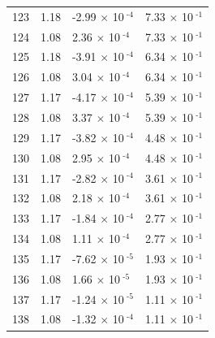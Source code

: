 \documentclass[a4paper,11pt]{article}
\begin{document}
\begin{center}
\begin{longtable}{|R{1.5cm}|R{2.5cm}|R{2.5cm}|R{2.5cm}|}
  123 &   1.18  &        -2.99 $\times$ 10$^{\text{          -4}}$  &         7.33 $\times$ 10$^{\text{          -1}}$ \\ 
  124 &   1.08  &         2.36 $\times$ 10$^{\text{          -4}}$  &         7.33 $\times$ 10$^{\text{          -1}}$ \\ 
  125 &   1.18  &        -3.91 $\times$ 10$^{\text{          -4}}$  &         6.34 $\times$ 10$^{\text{          -1}}$ \\ 
  126 &   1.08  &         3.04 $\times$ 10$^{\text{          -4}}$  &         6.34 $\times$ 10$^{\text{          -1}}$ \\ 
  127 &   1.17  &        -4.17 $\times$ 10$^{\text{          -4}}$  &         5.39 $\times$ 10$^{\text{          -1}}$ \\ 
  128 &   1.08  &         3.37 $\times$ 10$^{\text{          -4}}$  &         5.39 $\times$ 10$^{\text{          -1}}$ \\ 
  129 &   1.17  &        -3.82 $\times$ 10$^{\text{          -4}}$  &         4.48 $\times$ 10$^{\text{          -1}}$ \\ 
  130 &   1.08  &         2.95 $\times$ 10$^{\text{          -4}}$  &         4.48 $\times$ 10$^{\text{          -1}}$ \\ 
  131 &   1.17  &        -2.82 $\times$ 10$^{\text{          -4}}$  &         3.61 $\times$ 10$^{\text{          -1}}$ \\ 
  132 &   1.08  &         2.18 $\times$ 10$^{\text{          -4}}$  &         3.61 $\times$ 10$^{\text{          -1}}$ \\ 
  133 &   1.17  &        -1.84 $\times$ 10$^{\text{          -4}}$  &         2.77 $\times$ 10$^{\text{          -1}}$ \\ 
  134 &   1.08  &         1.11 $\times$ 10$^{\text{          -4}}$  &         2.77 $\times$ 10$^{\text{          -1}}$ \\ 
  135 &   1.17  &        -7.62 $\times$ 10$^{\text{          -5}}$  &         1.93 $\times$ 10$^{\text{          -1}}$ \\ 
  136 &   1.08  &         1.66 $\times$ 10$^{\text{          -5}}$  &         1.93 $\times$ 10$^{\text{          -1}}$ \\ 
  137 &   1.17  &        -1.24 $\times$ 10$^{\text{          -5}}$  &         1.11 $\times$ 10$^{\text{          -1}}$ \\ 
  138 &   1.08  &        -1.32 $\times$ 10$^{\text{          -4}}$  &         1.11 $\times$ 10$^{\text{          -1}}$ \\ 

\end{longtable}
\end{center}
\end{document}
